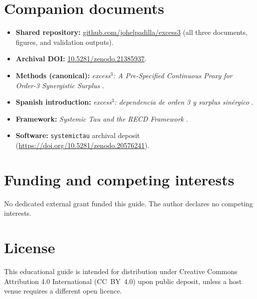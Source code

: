 \documentclass[11pt,a4paper]{article}
\newcommand{\ExcessThreeRepo}{https://github.com/johelpadilla/excess3}
\newcommand{\ExcessThreeRepoShort}{github.com/johelpadilla/excess3}
\newcommand{\ExcessThreeDOI}{10.5281/zenodo.21385937}
\newcommand{\ExcessThreeDOIURL}{https://doi.org/10.5281/zenodo.21385937}
\begin{document}
\section*{Companion documents}
\begin{itemize}[leftmargin=*]
  \item \textbf{Shared repository:}
  \href{\ExcessThreeRepo}{\ExcessThreeRepoShort}
  (all three documents, figures, and validation outputs).
  \item \textbf{Archival DOI:}
  \href{\ExcessThreeDOIURL}{\ExcessThreeDOI}.
  \item \textbf{Methods (canonical):}
  \emph{excess$^3$: A Pre-Specified Continuous Proxy for Order-3 Synergistic
  Surplus} \citep{Padilla2026excess3}.
  \item \textbf{Spanish introduction:}
  \emph{excess$^3$: dependencia de orden 3 y surplus sin\'ergico}
  \citep{Padilla2026intro}.
  \item \textbf{Framework:}
  \emph{Systemic Tau and the RECD Framework}
  \citep{Padilla2026framework}.
  \item \textbf{Software:}
  \texttt{systemictau} archival deposit \citep{Padilla2026software}
  (\url{https://doi.org/10.5281/zenodo.20576241}).
\end{itemize}

\section*{Funding and competing interests}
No dedicated external grant funded this guide. The author declares no
competing interests.

\section*{License}
This educational guide is intended for distribution under Creative Commons
Attribution 4.0 International (CC~BY~4.0) upon public deposit, unless a host
venue requires a different open licence.



\end{document}

